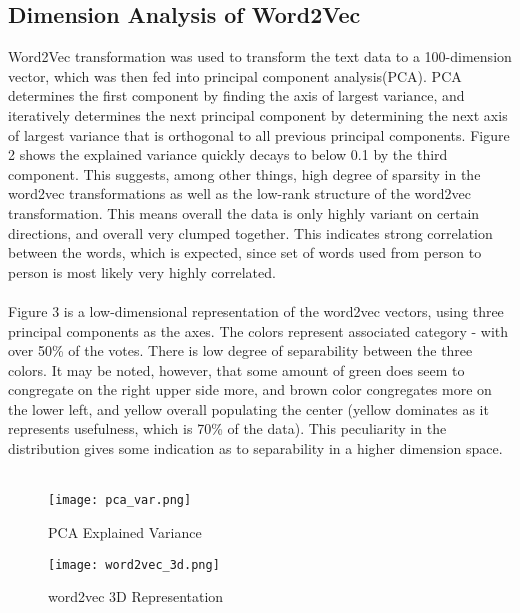 \documentclass{article}
\begin{document}
\subsection{Dimension Analysis of Word2Vec}

Word2Vec transformation was used to transform the text data to a 100-dimension vector, which was then fed into principal component analysis(PCA). PCA determines the first component by finding the axis of largest variance, and iteratively determines the next principal component by determining the next axis of largest variance that is orthogonal to all previous principal components. Figure 2 shows the explained variance quickly decays to below 0.1 by the third component. This suggests, among other things, high degree of sparsity in the word2vec transformations as well as the low-rank structure of the word2vec transformation. This means overall the data is only highly variant on certain directions, and overall very clumped together. This indicates strong correlation between the words, which is expected, since set of words used from person to person is most likely very highly correlated. \\\\
Figure 3 is a low-dimensional representation of the word2vec vectors, using three principal components as the axes. The colors represent associated category - with over 50\% of the votes. There is low degree of separability between the three colors. It may be noted, however, that some amount of green does seem to congregate on the right upper side more, and brown color congregates more on the lower left, and yellow overall populating the center (yellow dominates as it represents usefulness, which is 70\% of the data). This peculiarity in the distribution gives some indication as to separability in a higher dimension space. \\\\
\begin{figure}
    \centering
    \begin{minipage}{0.5\textwidth}
        \centering
        \texttt{[image: pca\_var.png]} 
        \caption{PCA Explained Variance}
    \end{minipage}\hfill
    \begin{minipage}{0.5\textwidth}
        \centering
        \texttt{[image: word2vec\_3d.png]} 
        \caption{word2vec 3D Representation}
    \end{minipage}
\end{figure}
\end{document}
